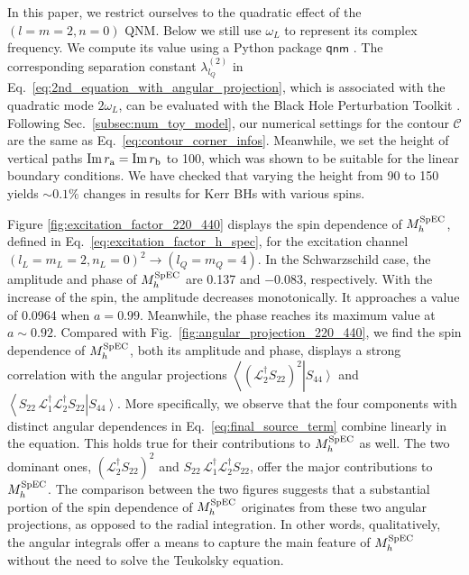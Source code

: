 \documentclass[aps,prd,amsmath,floats,floatfix, twocolumn,
superscriptaddress,nofootinbib,showpacs]{revtex4-1}
\begin{document}
In this paper, we restrict ourselves to the quadratic effect of the $(l=m=2,n=0)$ QNM. Below we still use $\omega_L$ to represent its complex frequency. We compute its value using a Python package $\textsf{qnm}$ \cite{Stein:2019mop}. The corresponding separation constant $\lambda^{(2)}_{l_Q}$ in Eq.~\eqref{eq:2nd_equation_with_angular_projection}, which is associated with the quadratic mode $2\omega_L$, can be evaluated with the Black Hole Perturbation Toolkit \cite{BHPToolkit}. Following Sec.~\ref{subsec:num_toy_model}, our numerical settings for the contour $\mathcal{C}$ are the same as Eq.~\eqref{eq:contour_corner_infos}. Meanwhile, we set the height of vertical paths ${\rm Im}\, r_{\rm a}={\rm Im}\, r_{\rm b}$ to 100, which was shown to be suitable for the linear boundary conditions. We have checked that varying the height from 90 to 150 yields $\sim 0.1\%$ changes in results for Kerr BHs with various spins.

Figure \ref{fig:excitation_factor_220_440} displays the spin dependence of $M_{h}^{\rm SpEC}$, defined in Eq.~\eqref{eq:excitation_factor_h_spec}, for the excitation channel $(l_L=m_L=2,n_L=0)^2 \to (l_Q=m_Q=4)$. In the Schwarzschild case, the amplitude and phase of $M_{h}^{\rm SpEC}$ are 0.137 and $-0.083$, respectively. With the increase of the spin, the amplitude decreases monotonically. It approaches a value of 0.0964 when $a=0.99$. Meanwhile, the phase reaches its maximum value at $a\sim0.92$. Compared with Fig.~\ref{fig:angular_projection_220_440}, we find the spin dependence of $M_{h}^{\rm SpEC}$, both its amplitude and phase, displays a strong correlation with the angular projections $\left<\left(\mathcal{L}_2^\dagger S_{22}\right)^2\right|\left.S_{44}\right>$ and $  \left<S_{22}\,\mathcal{L}_1^\dagger\mathcal{L}_2^\dagger S_{22}\right|\left.S_{44}\right>$. More specifically, we observe that the four components with distinct angular dependences in Eq.~\eqref{eq:final_source_term} combine linearly in the equation. This holds true for their contributions to $M_{h}^{\rm SpEC}$ as well. The two dominant ones, $\left(\mathcal{L}_2^\dagger S_{22}\right)^2$ and $S_{22}\,\mathcal{L}_1^\dagger\mathcal{L}_2^\dagger S_{22}$, offer the major contributions to $M_{h}^{\rm SpEC}$. The comparison between the two figures suggests that a substantial portion of the spin dependence of $M_{h}^{\rm SpEC}$ originates from these two angular projections, as opposed to the radial integration. In other words, qualitatively, the angular integrals offer a means to capture the main feature of $M_{h}^{\rm SpEC}$ without the need to solve the Teukolsky equation.
\end{document}
